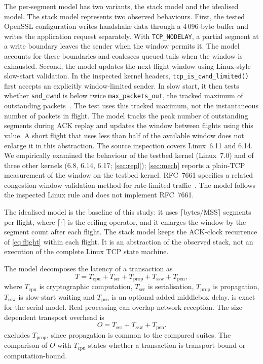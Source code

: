 \documentclass[preprint,12pt]{elsarticle}
\newcommand{\cpu}{\mathrm{cpu}}
\begin{document}
The per-segment model has two variants, the stack model and the idealised model. The stack model represents two observed behaviours. First, the tested OpenSSL configuration writes handshake data through a 4\,096-byte buffer and writes the application request separately. With \texttt{TCP\_NODELAY}, a partial segment at a write boundary leaves the sender when the window permits it. The model accounts for these boundaries and coalesces queued tails when the window is exhausted. Second, the model updates the next flight window using Linux-style slow-start validation. In the inspected kernel headers, \texttt{tcp\_is\_cwnd\_limited()} first accepts an explicitly window-limited sender. In slow start, it then tests whether \texttt{snd\_cwnd} is below twice \texttt{max\_packets\_out}, the tracked maximum of outstanding packets~\cite{linuxtcp}. The test uses this tracked maximum, not the instantaneous number of packets in flight. The model tracks the peak number of outstanding segments during ACK replay and updates the window between flights using this value. A short flight that uses less than half of the available window does not enlarge it in this abstraction. The source inspection covers Linux~6.11 and 6.14. We empirically examined the behaviour of the testbed kernel (Linux~7.0) and of three other kernels (6.8, 6.14, 6.17; \cref{sec:repl}); \cref{sec:mech} reports a plain-TCP measurement of the window on the testbed kernel. RFC~7661 specifies a related congestion-window validation method for rate-limited traffic~\cite{rfc7661}. The model follows the inspected Linux rule and does not implement RFC~7661.

The idealised model is the baseline of this study: it uses $\lceil\text{bytes}/\mathrm{MSS}\rceil$ segments per flight, where $\lceil\cdot\rceil$ is the ceiling operator, and it enlarges the window by the segment count after each flight. The stack model keeps the ACK-clock recurrence of \cref{eq:flight} within each flight. It is an abstraction of the observed stack, not an execution of the complete Linux TCP state machine.

The model decomposes the latency of a transaction as
\begin{equation}
T=T_\cpu+T_\mathrm{ser}+T_\mathrm{prop}+T_\mathrm{ssw}+T_\mathrm{pen},
\label{eq:latency}
\end{equation}
where $T_\cpu$ is cryptographic computation, $T_\mathrm{ser}$ is serialisation, $T_\mathrm{prop}$ is propagation, $T_\mathrm{ssw}$ is slow-start waiting and $T_\mathrm{pen}$ is an optional added middlebox delay.  is exact for the serial model. Real processing can overlap network reception. The size-dependent transport overhead is
\begin{equation}
O=T_\mathrm{ser}+T_\mathrm{ssw}+T_\mathrm{pen}.
\label{eq:overhead}
\end{equation}
 excludes $T_\mathrm{prop}$, since propagation is common to the compared suites. The comparison of $O$ with $T_\cpu$ states whether a transaction is transport-bound or computation-bound.
\end{document}
